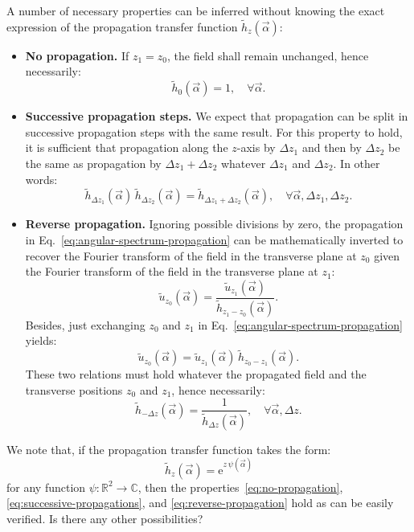 \documentclass[a4paper]{article}
\newcommand{\oops}[1]{{\color{purple}#1}}
\newcommand*{\mathe}{\mathrm{e}}
\newcommand*{\FT}[1]{\widetilde{#1}}
\begin{document}
A number of necessary properties can be inferred without knowing the exact
expression of the propagation transfer function $\FT{h}_{z}(\vec{α})$:
\begin{itemize}
\item \textbf{No propagation.} If $z_{1} = z_{0}$, the field shall remain
      unchanged, hence necessarily:
      \begin{equation}
        \label{eq:no-propagation}
        \FT{h}_{0}(\vec{α}) = 1,\quad ∀\vec{α}.
      \end{equation}

\item \textbf{Successive propagation steps.} We expect that propagation can be
      split in successive propagation steps with the same result. For this
      property to hold, it is sufficient that propagation along the $z$-axis by
      $Δz_{1}$ and then by $Δz_{2}$ be the same as propagation by
      $Δz_{1} + Δz_{2}$ whatever $Δz_{1}$ and $Δz_{2}$.
      In other words:
      \begin{equation}
        \label{eq:successive-propagations}
        \FT{h}_{Δz_{1}}(\vec{α})\,
        \FT{h}_{Δz_{2}}(\vec{α}) =
        \FT{h}_{Δz_{1} + Δz_{2}}(\vec{α}),
        \quad ∀\vec{α},Δz_{1}, Δz_{2}.
      \end{equation}

\item \textbf{Reverse propagation.} Ignoring possible divisions by zero, the
      propagation in Eq.~\eqref{eq:angular-spectrum-propagation} can be
      mathematically inverted to recover the Fourier transform of the field in
      the transverse plane at $z_{0}$ given the Fourier transform of the field
      in the transverse plane at $z_{1}$:
      \begin{displaymath}
        \FT{u}_{z_{0}}(\vec{α})
        = \frac{\FT{u}_{z_{1}}(\vec{α})}{\FT{h}_{z_{1} - z_{0}}(\vec{α})}.
      \end{displaymath}
      Besides, just exchanging $z_{0}$ and $z_{1}$ in
      Eq.~\eqref{eq:angular-spectrum-propagation} yields:
      \begin{displaymath}
        \FT{u}_{z_{0}}(\vec{α}) =
        \FT{u}_{z_{1}}(\vec{α})\,\FT{h}_{z_{0} - z_{1}}(\vec{α}).
      \end{displaymath}
      These two relations must hold whatever the propagated field and the
      transverse positions $z_{0}$ and $z_{1}$, hence necessarily:
      \begin{equation}
        \label{eq:reverse-propagation}
        \FT{h}_{-Δz}(\vec{α})
        = \frac{1}{\FT{h}_{Δz}(\vec{α})},\quad ∀\vec{α},Δz.
      \end{equation}
\end{itemize}
We note that, if the propagation transfer function takes the form:
\begin{equation}
  \label{eq:exponential-form}
  \FT{h}_{z}(\vec{α}) = \mathe^{z\,ψ(\vec{α})}
\end{equation}
for any function $ψ:ℝ^{2}\to ℂ$, then the properties~\eqref{eq:no-propagation},
\eqref{eq:successive-propagations}, and \eqref{eq:reverse-propagation} hold as
can be easily verified. \oops{Is there any other possibilities?}
\end{document}
